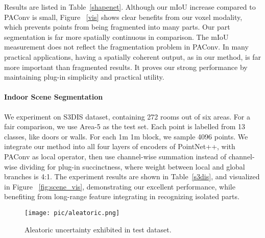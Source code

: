 \documentclass[sigconf]{acmart}
\begin{document}
Results are listed in Table~\ref{shapenet}. Although our mIoU increase compared to PAConv\cite{xu2021paconv} is small, Figure ~\ref{vis} shows clear benefits from our voxel modality, which prevents points from being fragmented into many parts.  Our part segmentation is far more spatially continuous in comparison.  The mIoU measurement does not reflect the fragmentation problem in PAConv\cite{xu2021paconv}.  In many practical applications, having a spatially coherent output, as in our method, is far more important than fragmented results. It proves our strong performance by maintaining plug-in simplicity and practical utility.














\paragraph{Indoor Scene Segmentation}
We experiment on S3DIS\cite{armeni20163d} dataset, containing 272 rooms out of six areas. For a fair comparison, we use Area-5 as the test set.  Each point is labelled from 13 classes, like doors or walls. For each 1m  1m block, we sample 4096 points. We integrate our method into all four layers of encoders of PointNet++\cite{qi2017pointnet++}, with PAConv\cite{xu2021paconv} as local operator, then use channel-wise summation instead of channel-wise dividing for plug-in succinctness, where weight between local and global branches is 4:1.  The experiment results are shown in Table~\ref{s3dis}, and visualized in Figure ~\ref{fig:scene_vis}, demonstrating our excellent performance, while benefiting from long-range feature integrating in recognizing isolated parts.
















\begin{figure}[t]
  \centering
\texttt{[image: pic/aleatoric.png]}
  \caption{Aleatoric uncertainty exhibited in test dataset.}
    \label{fig:aleatoric}
    \vspace{-0.5cm}
\end{figure}
\end{document}
